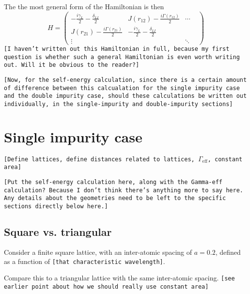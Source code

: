 \documentclass[aps,pra,superscriptaddress,twocolumn]{revtex4-1}
\newcommand{\commentSB}[1]{\texttt{\color{blue}[#1]}}
\newcommand{\commentSO}[1]{\texttt{\color{orange}[#1]}}
\begin{document}
    The the most general form of the Hamiltonian is then
    \begin{equation}
        H = 
        \begin{pmatrix}
            -\frac{i \gamma_L}{2} - \frac{\delta_{LI}}{2} & J(r_{12}) - \frac{i \Gamma(r_{12})}{2} & \cdots \\
            J(r_{21}) - \frac{i \Gamma(r_{21})}{2} & -\frac{i \gamma_L}{2} - \frac{\delta_{LI}}{2} & & \\
            \vdots & & \ddots

        \end{pmatrix}
    \end{equation}
    \commentSB{I haven't written out this Hamiltonian in full, because my first question is whether such a general Hamiltonian is even worth writing out. Will it be obvious to the reader?}

    \commentSB{Now, for the self-energy calculation, since there is a certain amount of difference between this calcualation for the single impurity case and the double impurity case, should these calculations be written out individually, in the single-impurity and double-impurity sections}



\section{Single impurity case}
\commentSO{Define lattices, define distances related to lattices, $\Gamma_\mathrm{eff}$, constant area}

\commentSB{Put the self-energy calculation here, along with the Gamma-eff calculation? Because I don't think there's anything more to say here. Any details about the geometries need to be left to the specific sections directly below here.}

\subsection{Square vs. triangular}

Consider a finite square lattice, with an inter-atomic spacing of $a = 0.2$, defined as a function of \commentSB{that characteristic wavelength}. 

Compare this to a triangular lattice with the same inter-atomic spacing. 
\commentSB{see earlier point about how we should really use constant area}
\end{document}
